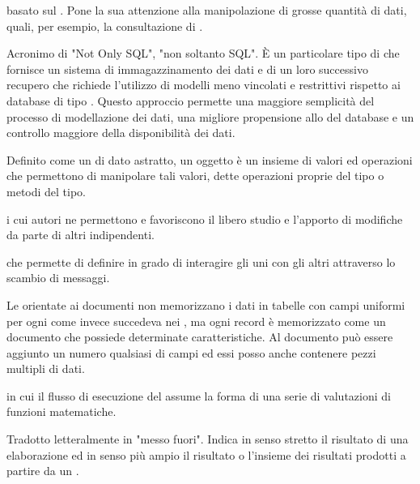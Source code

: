 

{ basato sul  . Pone la sua attenzione alla manipolazione di grosse quantità di dati, quali, per esempio, la consultazione di .}

{Acronimo di "Not Only SQL", "non soltanto SQL". \`{E} un particolare tipo di  che fornisce un sistema di immagazzinamento dei dati e di un loro successivo recupero che richiede l'utilizzo di modelli meno vincolati e restrittivi rispetto ai database di tipo . Questo approccio permette una maggiore semplicità del processo di modellazione dei dati, una migliore propensione allo  del database e un controllo maggiore della disponibilità dei dati.}




{Definito come un  di dato astratto, un oggetto è un insieme di valori ed operazioni che permettono di manipolare tali valori, dette operazioni proprie del tipo o metodi del tipo.}

{ i cui autori ne permettono e favoriscono il libero studio e l'apporto di modifiche da parte di altri  indipendenti.}

{ che permette di definire  in grado di interagire gli uni con gli altri attraverso lo scambio di messaggi.}

{Le  orientate ai documenti non memorizzano i dati in tabelle con campi uniformi per ogni  come invece succedeva nei  , ma ogni record è memorizzato come un documento che possiede determinate caratteristiche. Al documento può essere aggiunto un numero qualsiasi di campi ed essi posso anche contenere pezzi multipli di dati.}

{ in cui il flusso di esecuzione del  assume la forma di una serie di valutazioni di funzioni matematiche.}

{Tradotto letteralmente in "messo fuori". Indica in senso stretto il risultato di una elaborazione ed in senso più ampio il risultato o l'insieme dei risultati prodotti a partire da un .}

